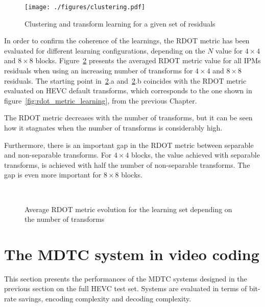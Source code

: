 \documentclass[11pt,a4paper,openright,twoside]{book}
\numberwithin{equation}{section} %
\numberwithin{figure}{section} %
\numberwithin{table}{section} %
\begin{document}
\begin{figure}[tp]
	\centering
	\texttt{[image: ./figures/clustering.pdf]}
	\caption{Clustering and transform learning for a given set of residuals}
	\label{fig:clustering}
\end{figure}

In order to confirm the coherence of the learnings, the \ac{RDOT} metric has
been evaluated for different learning configurations, depending on the $N$
value for $4\times4$ and $8\times8$ blocks.
Figure~\ref{fig:mdtc_rdot_metric_ntransforms} presents the averaged \ac{RDOT}
metric value for all \acp{IPM} residuals when using an increasing number of
transforms for $4\times4$ and $8\times8$ residuals.
The starting point in~\ref{fig:mdtc_rdot_metric_ntransforms}.a
and~\ref{fig:mdtc_rdot_metric_ntransforms}.b coincides with the \ac{RDOT}
metric evaluated on \ac{HEVC} default transforms, which corresponds to the one
shown in figure~\ref{fig:rdot_metric_learning}, from the previous Chapter.

The \ac{RDOT} metric decreases with the number of transforms, but it can be
seen how it stagnates when the number of transforms is considerably high.

Furthermore, there is an important gap in the \ac{RDOT} metric between
separable and non-separable transforms.
For $4\times4$ blocks, the value achieved with separable transforms, is
achieved with half the number of non-separable transforms.
The gap is even more important for $8\times8$ blocks.

\begin{figure}[tb]
	\centering
	\\
	\caption[\acs{RDOT} metric for different separable and non-separable
	transform learnings]
	{Average \acs{RDOT} metric evolution for the learning set depending
	on the number of transforms}
	\label{fig:mdtc_rdot_metric_ntransforms}
\end{figure}

\section{The \acs{MDTC} system in video coding}
\label{sec:performances_of_the_mdtc_system}

This section presents the performances of the \ac{MDTC} systems designed in
the previous section on the full \ac{HEVC} test set.
Systems are evaluated in terms of bit-rate savings, encoding complexity and
decoding complexity.
\end{document}
